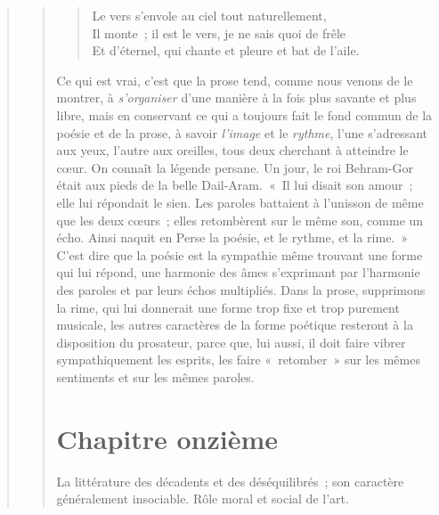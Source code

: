 \documentclass[french,twoside]{book} %
\newcommand\chapteropen{} %
\newcommand\chaptercont{} %
\newcommand\chapterclose{} %
\begin{document}
\begin{verse}
\begin{verse}
\begin{verse}
Le vers s’envole au ciel tout naturellement,\\
Il monte ; il est le vers, je ne sais quoi de frêle\\
Et d’éternel, qui chante et pleure et bat de l’aile.\\
\end{verse}

\noindent Ce qui est vrai, c’est que la prose tend, comme nous venons de le montrer, à \emph{s’organiser} d’une manière à la fois plus savante et plus libre, mais en conservant ce qui a toujours fait le fond commun de la poésie et de la prose, à savoir \emph{l’image} et le \emph{rythme}, l’une s’adressant aux yeux, l’autre aux oreilles, tous deux cherchant à atteindre le cœur. On connaît la légende persane. Un jour, le roi Behram-Gor était aux pieds de la belle Dail-Aram. « Il lui disait son amour ; elle lui répondait le sien. Les paroles battaient à l’unisson de même que les deux cœurs ; elles retombèrent sur le même son, comme un écho. Ainsi naquit en Perse la poésie, et le rythme, et la rime. » C’est dire que la poésie est la sympathie même trouvant une forme qui lui répond, une harmonie des âmes s’exprimant par l’harmonie des paroles et par leurs échos multipliés. Dans la prose, supprimons la rime, qui lui donnerait une forme trop fixe et trop purement musicale, les autres caractères de la forme poétique resteront à la disposition du prosateur, parce que, lui aussi, il doit faire vibrer sympathiquement les esprits, les faire « retomber » sur les mêmes sentiments et sur les mêmes paroles.
\chapterclose


\chapteropen
\chapter[{Chapitre onzième}]{Chapitre onzième}\renewcommand{\leftmark}{Chapitre onzième}

\begin{center}La littérature des décadents et des déséquilibrés ; son caractère généralement insociable. Rôle moral et social de l’art.\end{center}

\chaptercont

\end{verse}
\end{verse}
\end{document}

